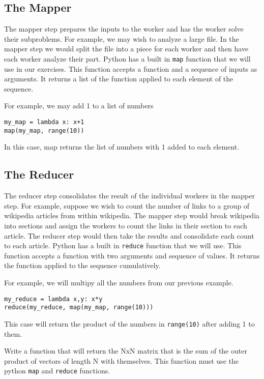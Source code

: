 \subsection{The Mapper}

The mapper step prepares the inputs to the worker and has the worker solve their subproblems.
For example, we may wish to analyze a large file.
In the mapper step we would split the file into a piece for each worker and then have each worker analyze their part.
Python has a built in {\tt map} function that we will use in our exercises.
This function accepts a function and a sequence of inputs as arguments.
It returns a list of the function applied to each element of the sequence.

For example, we may add 1 to a list of numbers

\begin{lstlisting}
my_map = lambda x: x+1
map(my_map, range(10))
\end{lstlisting} 

In this case, map returns the list of numbers with 1 added to each element.

\subsection{The Reducer}

The reducer step consolidates the result of the individual workers in the mapper step.
For example, suppose we wish to count the number of links to a group of wikipedia articles from within wikipedia.
The mapper step would break wikipedia into sections and assign the workers to count the links in their section to each article.
The reducer step would then take the results and consolidate each count to each article.
Python has a built in {\tt reduce} function that we will use.
This function accepts a function with two arguments and sequence of values.
It returns the function applied to the sequence cumulatively.

For example, we will multipy all the numbers from our previous example.
\begin{lstlisting}
my_reduce = lambda x,y: x*y
reduce(my_reduce, map(my_map, range(10)))
\end{lstlisting}

This case will return the product of the numbers in {\tt range(10)} after adding 1 to them.

\begin{problem}
Write a function that will return the NxN matrix that is the sum of the outer product of vectors of length N with themselves.
This function must use the python {\tt map} and {\tt reduce} functions.
\end{problem}

